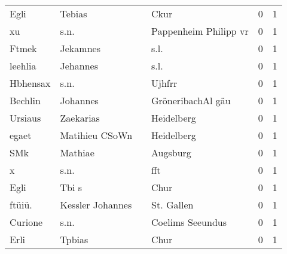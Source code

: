 \begin{tabular}{llllrr}
                     Egli &                             Tebias &             &                                        Ckur &          0 &         1 \\
                       xu &                               s.n. &             &                       Pappenheim Philipp vr &          0 &         1 \\
                    Ftmek &                           Jekamnes &             &                                        s.l. &          0 &         1 \\
                  leehlia &                           Jehannes &             &                                        s.l. &          0 &         1 \\
                 Hbhensax &                               s.n. &             &                                      Ujhfrr &          0 &         1 \\
                  Bechlin &                           Johannes &             &                           GröneribachAl gäu &          0 &         1 \\
                  Ursiaus &                          Zaekarias &             &                                  Heidelberg &          0 &         1 \\
                    egaet &                     Matihieu CSoWn &             &                                  Heidelberg &          0 &         1 \\
                      SMk &                            Mathiae &             &                                    Augsburg &          0 &         1 \\
                        x &                               s.n. &             &                                         fft &          0 &         1 \\
                     Egli &                              Tbi s &             &                                        Chur &          0 &         1 \\
                   ftüiü. &                   Kessler Johannes &             &                                  St. Gallen &          0 &         1 \\
                  Curione &                               s.n. &             &                            Coelims Seeundus &          0 &         1 \\
                     Erli &                             Tpbias &             &                                        Chur &          0 &         1 \\

\end{tabular}
